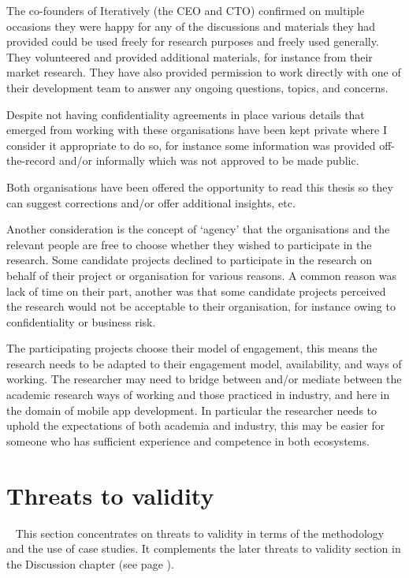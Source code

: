 The co-founders of Iteratively (the CEO and CTO) confirmed on multiple occasions they were happy for any of the discussions and materials they had provided could be used freely for research purposes and freely used generally. They volunteered and provided additional materials, for instance from their market research. They have also provided permission to work directly with one of their development team to answer any ongoing questions, topics, and concerns.

Despite not having confidentiality agreements in place various details that emerged from working with these organisations have been kept private where I consider it appropriate to do so, for instance some information was provided off-the-record and/or informally which was not approved to be made public. 

Both organisations have been offered the opportunity to read this thesis so they can suggest corrections and/or offer additional insights, etc.


Another consideration is the concept of `agency' that the organisations and the relevant people are free to choose whether they wished to participate in the research. Some candidate projects declined to participate in the research on behalf of their project or organisation for various reasons. A common reason was lack of time on their part, another was that some candidate projects perceived the research would not be acceptable to their organisation, for instance owing to confidentiality or business risk.

The participating projects choose their model of engagement, this means the research needs to be adapted to their engagement model, availability, and ways of working. The researcher may need to bridge between and/or mediate between the academic research ways of working and those practiced in industry, and here in the domain of mobile app development. In particular the researcher needs to uphold the expectations of both academia and industry, this may be easier for someone who has sufficient experience and competence in both ecosystems.

\section{Threats to validity}~\label{methodology-threats-to-validity-section}
This section concentrates on threats to validity in terms of the methodology and the use of case studies. It complements the later threats to validity section in the Discussion chapter (see page \pageref{discussion-threats-to-validity-section}).

